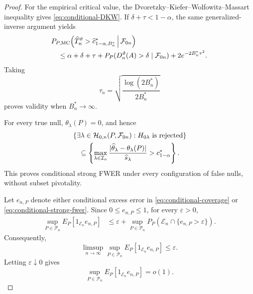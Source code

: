 \documentclass[11pt]{article}
\theoremstyle{definition}
\newcommand{\1}{\mathbf 1}\newcommand{\op}{\operatorname}
\begin{document}
\begin{proof}
For the empirical critical value, the
Dvoretzky--Kiefer--Wolfowitz--Massart inequality
\citep{Massart1990} gives \eqref{eq:conditional-DKW}. If
$\delta+\tau<1-\alpha$, the same generalized-inverse argument yields
\begin{align}
&P_{P,\mathrm{MC}}\!\left(
\widehat T_n^\vartheta>
\widehat c_{1-\alpha,B_n^*}^*
\,\middle|\,
\mathcal F_{0n}
\right)
\notag\\
&\quad\le
\alpha+\delta+\tau
+
P_P(D_n^\vartheta(A)>\delta\mid\mathcal F_{0n})
+
2e^{-2B_n^*\tau^2}.
\label{eq:finite-MC-bound}
\end{align}
Taking
\[
\tau_n
=
\sqrt{\frac{\log(2B_n^*)}{2B_n^*}}
\]
proves validity when $B_n^*\to\infty$.

For every true null, $\theta_\lambda(P)=0$, and hence
\begin{align}
&\left\{
\exists\lambda\in\mathcal H_{0,n}(P,\mathcal F_{0n}):
H_{0\lambda}\text{ is rejected}
\right\}
\notag\\
&\quad\subseteq
\left\{
\max_{\lambda\in\mathcal I_n}
\frac{
|\widehat\theta_\lambda-\theta_\lambda(P)|
}{
\widehat s_\lambda
}
>
c_{1-\alpha}^*
\right\}.
\label{eq:FWER-inclusion}
\end{align}
This proves conditional strong FWER under every configuration of false
nulls, without subset pivotality.

Let $e_{n,P}$ denote either conditional excess error in
\eqref{eq:conditional-coverage} or
\eqref{eq:conditional-strong-fwer}. Since $0\le e_{n,P}\le1$, for
every $\varepsilon>0$,
\begin{align}
\sup_{P\in\mathcal P_n}
E_P[1_{\mathcal E_n}e_{n,P}]
&\le
\varepsilon
+
\sup_{P\in\mathcal P_n}
P_P\!\left(
\mathcal E_n\cap\{e_{n,P}>\varepsilon\}
\right).
\label{eq:bounded-error-integration}
\end{align}
Consequently,
\[
\limsup_{n\to\infty}
\sup_{P\in\mathcal P_n}
E_P[1_{\mathcal E_n}e_{n,P}]
\le\varepsilon.
\]
Letting $\varepsilon\downarrow0$ gives
\begin{equation}
\sup_{P\in\mathcal P_n}
E_P[1_{\mathcal E_n}e_{n,P}]
=o(1).
\label{eq:integrated-excess-error}
\end{equation}


\end{proof}
\end{document}

